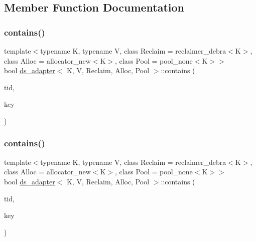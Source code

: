 \subsection{Member Function Documentation}
\mbox{\label{classds__adapter_aecf1899dbe9fae93c72ee2b5549cf6eb}} 
\subsubsection{\texorpdfstring{contains()}{contains()}\hspace{0.1cm}{\footnotesize\ttfamily [1/26]}}
{\footnotesize\ttfamily template$<$typename K, typename V, class Reclaim = reclaimer\+\_\+debra$<$\+K$>$, class Alloc = allocator\+\_\+new$<$\+K$>$, class Pool = pool\+\_\+none$<$\+K$>$$>$ \\
bool \hyperlink{classds__adapter}{ds\+\_\+adapter}$<$ K, V, Reclaim, Alloc, Pool $>$\+::contains (\begin{DoxyParamCaption}\item[{const int}]{tid,  }\item[{const K \&}]{key }\end{DoxyParamCaption})\hspace{0.3cm}{\ttfamily [inline]}}

\mbox{\label{classds__adapter_aecf1899dbe9fae93c72ee2b5549cf6eb}} 
\subsubsection{\texorpdfstring{contains()}{contains()}\hspace{0.1cm}{\footnotesize\ttfamily [2/26]}}
{\footnotesize\ttfamily template$<$typename K, typename V, class Reclaim = reclaimer\+\_\+debra$<$\+K$>$, class Alloc = allocator\+\_\+new$<$\+K$>$, class Pool = pool\+\_\+none$<$\+K$>$$>$ \\
bool \hyperlink{classds__adapter}{ds\+\_\+adapter}$<$ K, V, Reclaim, Alloc, Pool $>$\+::contains (\begin{DoxyParamCaption}\item[{const int}]{tid,  }\item[{const K \&}]{key }\end{DoxyParamCaption})\hspace{0.3cm}{\ttfamily [inline]}}


